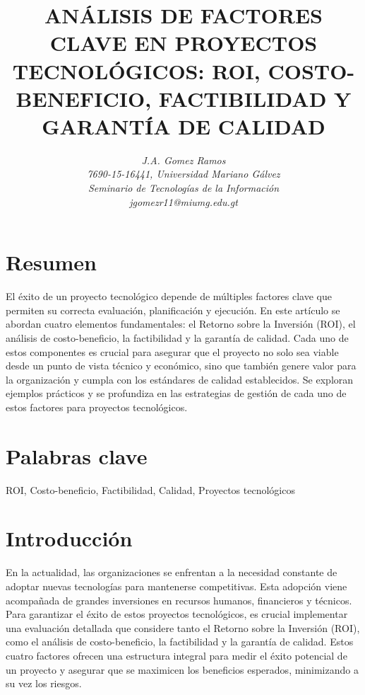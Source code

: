 \documentclass[12pt]{article}
\begin{document}
\title{\textbf{ANÁLISIS DE FACTORES CLAVE EN PROYECTOS TECNOLÓGICOS: ROI, COSTO-BENEFICIO, FACTIBILIDAD Y GARANTÍA DE CALIDAD}}
\author{\textit{J.A. Gomez Ramos}\\
\textit{7690-15-16441, Universidad Mariano Gálvez}\\
\textit{Seminario de Tecnologías de la Información}\\
\textit{jgomezr11@miumg.edu.gt}}
\date{}
\maketitle

\section*{Resumen}
El éxito de un proyecto tecnológico depende de múltiples factores clave que permiten su correcta evaluación, planificación y ejecución. En este artículo se abordan cuatro elementos fundamentales: el Retorno sobre la Inversión (ROI), el análisis de costo-beneficio, la factibilidad y la garantía de calidad. Cada uno de estos componentes es crucial para asegurar que el proyecto no solo sea viable desde un punto de vista técnico y económico, sino que también genere valor para la organización y cumpla con los estándares de calidad establecidos. Se exploran ejemplos prácticos y se profundiza en las estrategias de gestión de cada uno de estos factores para proyectos tecnológicos.

\section*{Palabras clave}
ROI, Costo-beneficio, Factibilidad, Calidad, Proyectos tecnológicos

\section*{Introducción}
En la actualidad, las organizaciones se enfrentan a la necesidad constante de adoptar nuevas tecnologías para mantenerse competitivas. Esta adopción viene acompañada de grandes inversiones en recursos humanos, financieros y técnicos. Para garantizar el éxito de estos proyectos tecnológicos, es crucial implementar una evaluación detallada que considere tanto el Retorno sobre la Inversión (ROI), como el análisis de costo-beneficio, la factibilidad y la garantía de calidad. Estos cuatro factores ofrecen una estructura integral para medir el éxito potencial de un proyecto y asegurar que se maximicen los beneficios esperados, minimizando a su vez los riesgos.
\end{document}
